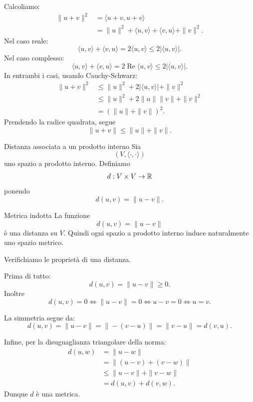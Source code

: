 \documentclass[a4paper]{article}
\begin{document}
\begin{snippetproof}{}
    Calcoliamo:
    \begin{align*}
        \|u+v\|^2
        &=
        \langle u+v,u+v\rangle\\
        &=
        \|u\|^2+\langle u,v\rangle+\langle v,u\rangle+\|v\|^2.
    \end{align*}
    Nel caso reale:
    \[
        \langle u,v\rangle+\langle v,u\rangle
        =
        2\langle u,v\rangle
        \leq
        2|\langle u,v\rangle|.
    \]
    Nel caso complesso:
    \[
        \langle u,v\rangle+\langle v,u\rangle
        =
        2\operatorname{Re}\langle u,v\rangle
        \leq
        2|\langle u,v\rangle|.
    \]
    In entrambi i casi, usando Cauchy-Schwarz:
    \begin{align*}
        \|u+v\|^2
        &\leq
        \|u\|^2+2|\langle u,v\rangle|+\|v\|^2\\
        &\leq
        \|u\|^2+2\|u\|\|v\|+\|v\|^2\\
        &=
        (\|u\|+\|v\|)^2.
    \end{align*}
    Prendendo la radice quadrata, segue
    \[
        \|u+v\|
        \leq
        \|u\|+\|v\|.
    \]
\end{snippetproof}

\begin{snippetdefinition}{Distanza associata a un prodotto interno}
    Sia
    \[
        (V,\langle\cdot,\cdot\rangle)
    \]
    uno spazio a prodotto interno. Definiamo
    \[
        d:V\times V\to\mathbb{R}
    \]
    ponendo
    \[
        d(u,v)=\|u-v\|.
    \]
\end{snippetdefinition}

\begin{snippetproposition}{Metrica indotta}
    La funzione
    \[
        d(u,v)=\|u-v\|
    \]
    è una distanza su \(V\). Quindi ogni spazio a prodotto interno induce naturalmente uno spazio metrico.
\end{snippetproposition}

\begin{snippetproof}{}
    Verifichiamo le proprietà di una distanza.

    Prima di tutto:
    \[
        d(u,v)=\|u-v\|\geq 0.
    \]
    Inoltre
    \[
        d(u,v)=0
        \Longleftrightarrow
        \|u-v\|=0
        \Longleftrightarrow
        u-v=0
        \Longleftrightarrow
        u=v.
    \]

    La simmetria segue da:
    \[
        d(u,v)=\|u-v\|=\|-(v-u)\|=\|v-u\|=d(v,u).
    \]

    Infine, per la disuguaglianza triangolare della norma:
    \begin{align*}
        d(u,w)
        &=
        \|u-w\|\\
        &=
        \|(u-v)+(v-w)\|\\
        &\leq
        \|u-v\|+\|v-w\|\\
        &=
        d(u,v)+d(v,w).
    \end{align*}
    Dunque \(d\) è una metrica.
\end{snippetproof}
\end{document}
